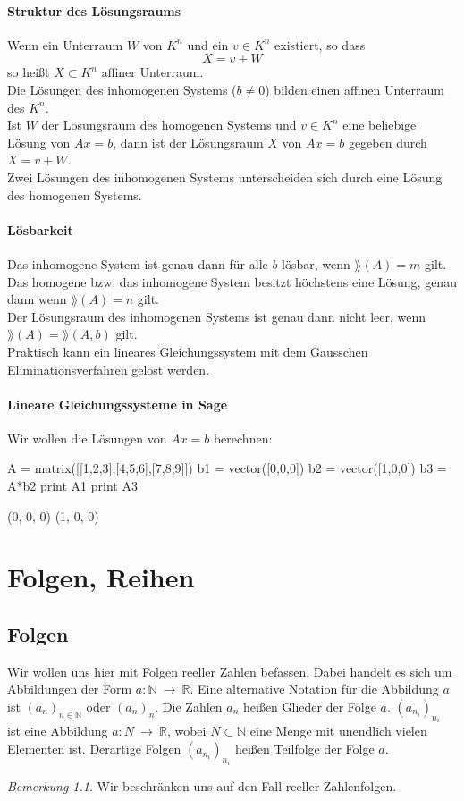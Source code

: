 \documentclass[fontsize=12pt,paper=a4,twoside,bibtotoc,idxtotoc,
liststotoc,pagesize,BCOR1.2cm,DIV15,chapterprefix,pagesize=pdftex]{scrbook}
\theoremstyle{plain}
\theoremstyle{definition}
\theoremstyle{remark}
\newtheorem{bem}[equation]{Bemerkung}
\begin{document}
\subsubsection{Struktur des Lösungsraums}
Wenn ein Unterraum $W$ von $K^n$ und ein $v \in K^n$ existiert, so dass 
\[X=v+W\]
so heißt $X \subset K^n$ affiner Unterraum.\\
Die Lösungen des inhomogenen Systems ($b \neq 0$) bilden einen affinen
Unterraum des $K^n$.\\
Ist $W$ der Lösungsraum des homogenen Systems und $v \in K^n$
eine beliebige Lösung von $Ax=b$, dann ist der Lösungsraum $X$ von $Ax=b$
gegeben durch  $X=v+W$.\\
Zwei Lösungen des inhomogenen Systems unterscheiden sich durch
eine Lösung des homogenen Systems.
\subsubsection{Lösbarkeit}
Das inhomogene System ist genau dann für alle $b$
lösbar, wenn $\rang(A)=m$ gilt.\\
Das homogene bzw. das inhomogene System besitzt höchstens eine
Lösung, genau dann wenn $\rang(A)=n$ gilt.\\
Der Lösungsraum des inhomogenen Systems ist genau dann nicht
leer, wenn $\rang(A)=\rang(A, b)$ gilt.\\ %
Praktisch kann ein lineares Gleichungssystem mit dem Gausschen
Eliminationsverfahren gelöst werden.
\subsubsection{Lineare Gleichungssysteme in Sage}
Wir wollen die Lösungen von $Ax=b$ berechnen: 
\begin{sagein}
A = matrix([[1,2,3],[4,5,6],[7,8,9]])
b1 = vector([0,0,0])
b2 = vector([1,0,0])
b3 = A*b2
print A\b1
print A\b3
\end{sagein}
\begin{sageout}
(0, 0, 0)
(1, 0, 0) 
\end{sageout}
\chapter{Folgen, Reihen}
\section{Folgen}
Wir wollen uns hier mit Folgen reeller Zahlen befassen. Dabei handelt es sich um 
Abbildungen der Form $a:\mathbb{N} \ \rightarrow \ \mathbb{R}$. 
Eine alternative Notation für die Abbildung $a$ ist $(a_n)_{n \in \mathbb{N}}$ oder $(a_n)_{n}$. 
Die Zahlen $a_n$ heißen Glieder der Folge $a$.
$(a_{n_i})_{n_i}$ ist eine Abbildung $a:N \
\rightarrow \ \mathbb{R}$, wobei $N \subset \mathbb{N}$ eine Menge mit
unendlich vielen Elementen ist. Derartige Folgen $(a_{n_i})_{n_i}$ heißen Teilfolge der Folge $a$.
\begin{bem}
 Wir beschränken uns auf den Fall reeller Zahlenfolgen. 
\end{bem}
\end{document}
